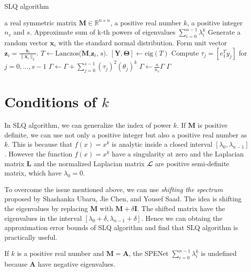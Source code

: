 \documentclass[senior,final,11pt]{iscs-thesis}
\begin{document}
\begin{algorithm}
    \caption{SLQ algorithm}
    \begin{algorithmic}[1]
    \renewcommand{\algorithmicrequire}{\textbf{Input:}}
    \renewcommand{\algorithmicensure}{\textbf{Output:}}
    \REQUIRE a real symmetric matrix ${\mathbf M} \in {\mathbb R}^{n\times n}$, a positive real number $k$, a positive integer $n_v$ and $s$.
    \ENSURE  Approximate sum of k-th powers of eigenvalues $\sum_{i=0}^{n-1} \lambda_i^k$
     \STATE Generate a random vector $\mathbf{x}_i$ with the standard normal distribution.
     \STATE Form unit vector $\mathbf{z}_i = \frac{\mathbf{x}_i}{\|\mathbf{x}_i\|_2}$.
     \STATE $T \leftarrow \text{Lanczos($\mathbf{M}$,$\mathbf{z}_i$, s)}$.
     \STATE $[\mathbf{Y}, \mathbf{\Theta}] \leftarrow \text{eig}(T)$
     \STATE Compute $\tau_j = [e_1^T y_j]$ for $j=0, ..., s-1$
     \STATE $\Gamma \leftarrow \Gamma + \sum_{j=0}^{s-1} (\tau_j)^2 (\theta_j)^k$
     \ENDFOR
    \STATE $\Gamma \leftarrow \frac{n}{n_v}\Gamma$
    \RETURN $\Gamma$
    \end{algorithmic}
\end{algorithm}


\section{Conditions of $k$}
In SLQ algorithm, we can generalize the index of power $k$. If ${\mathbf M}$ is positive definite, we can use not only a positive integer but also a positive real number as $k$. This is because that $f(x)=x^k$ is analytic inside a closed interval $[\lambda_0, \lambda_{n-1}]$. However the function $f(x)=x^k$ have a singularity at zero and the Laplacian matrix ${\mathbf L}$ and the normalized Laplacian matrix ${\mathbfcal L}$ are positive semi-definite matrix, which have $\lambda_0 = 0$.

To overcome the issue mentioned above, we can use {\it shifting the spectrum} proposed by Shashanka Ubaru, Jie Chen, and Yousef Saad\cite{ubaru2017fast}. The idea is shifting the eigenvalues by replacing ${\mathbf M}$ with ${\mathbf M}+\delta{\mathbf I}$. The shifted matrix have the eigenvalues in the interval $[\lambda_0 + \delta, \lambda_{n-1}+ \delta]$. Hence we can obtaing the approximation error bounds of SLQ algorithm and find that SLQ algorithm is practically useful.

If $k$ is a positive real number and ${\mathbf M}={\mathbf A}$, the SPENet $\sum_{i=0}^{n-1} \lambda_i^k$ is undefined because ${\mathbf A}$ have negative eigenvalues.
\end{document}
